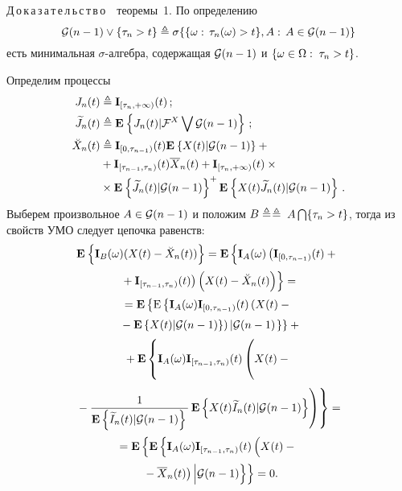 \begin{multicols}{2}
{\smallskip

\noindent
Д\,о\,к\,а\,з\,а\,т\,е\,л\,ь\,с\,т\,в\,о\ \ теоремы~1.
 По определению
$$
{\mathcal G} (n-1) \vee \{\tau_n > t\} \triangleq \sigma
\{ \{\omega:\,\tau_n(\omega) > t\} , A: \, A \in {\mathcal G} (n-1) \}
$$
есть минимальная $\sigma$-ал\-геб\-ра,
  содержащая ${\mathcal G} (n-1)$ и $\{\omega \hm\in \Omega:\;\tau_n \hm> t\}$.

 Определим процессы
\begin{align*}
 J_n(t) &\triangleq \mathbf{I}_{[\tau_n, + \infty)}(t)\,;
\\
\widetilde{J}_n(t) &\triangleq \mathbf{E}_{  }\left\{ \mathop{J_n(t)|{\mathcal F}^X\bigvee {\mathcal G} (n-1)} \right\}\,;
\\
 \breve{X}_n(t) &\triangleq
 \mathbf{I}_{[0,\tau_{n-1})}(t)\mathbf{E}_{  }\left\{ \mathop{X(t)|{\mathcal G} (n-1)} \right\}+{}\\
& {}+\mathbf{I}_{[\tau_{n-1},\tau_n)}
 (t)\overline{X}_n(t)+  \mathbf{I}_{[\tau_n, + \infty)}(t)\times{}\\
& {}\times \mathbf{E}_{  }\left\{ \mathop{\widetilde{J}_n(t)|{\mathcal G} (n-1)} \right\}^+
\mathbf{E}_{  }\left\{ \mathop{X(t)\widetilde{J}_n(t)|{\mathcal G} (n-1)} \right\}\,.
 \end{align*}
Выберем произвольное $A \hm\in \G (n-1)$ и положим
$B \triangleq$\linebreak $\triangleq\;A \bigcap \{\tau_n > t\}$, тогда из свойств УМО следует цепочка равенств:
 \begin{multline*}
 \me{}{\mathbf{I}_B(\omega)(X(t)-\breve{X}_n(t))}=
  \mathbf{E}\left\{
  \vphantom{\breve{X}_n(t)}
  \mathbf{I}_A(\omega)\left(\mathbf{I}_{[0,\tau_{n-1})}(t)+{}\right.\right.\\[2pt]
\left.\left.  {}+\mathbf{I}_{[\tau_{n-1},\tau_n)}(t)\right)
 \left(X(t)-\breve{X}_n(t)\right)\right\}={}\\[2pt]
 {}=
 \mathbf{E}\left\{\mathrm{E}\left\{\mathbf{I}_A(\omega)
 \mathbf{I}_{[0,\tau_{n-1})}(t)\left(
 X(t)-{}\right.\right.\right.\\[2pt]
\left.\left.\left. {}-\mathbf{E}\left\{X(t)|\G(n-1)\right\}\right)\left|\G(n-1)\right.\right\}\right\}+{}\\[2pt]
 {}+
 \mathbf{E}\left\{\mathbf{I}_A(\omega)\mathbf{I}_{[\tau_{n-1},\tau_n)}(t)
 \left(\vphantom{\fr{1}{\mathbf{E}\left\{\widetilde{I}_n(t)|\G (n-1)\right\}}}
 X(t)-{}\right.\right.\\[2pt]
\left.\left. {}-\fr{1}{\mathbf{E}\left\{\widetilde{I}_n(t)|\G (n-1)\right\}}\,
\mathbf{E}\left\{X(t)\widetilde{I}_n(t)|\G (n-1)\right\}\right)\right\}={}\\[2pt]
{} =\mathbf{E}\left\{\mathbf{E}\left\{
\mathbf{I}_A(\omega)\mathbf{I}_{[\tau_{n-1},\tau_n)}(t)\left(X(t)-
\vphantom{\overline{X}_n\Bigl|}{}\right.\right.\right.\\[2pt]
\left.\left.\left.{}-\overline{X}_n(t)\right)\Bigl|\G (n-1)\right\}\right\}=0.
 \end{multline*}

}
\end{multicols}
